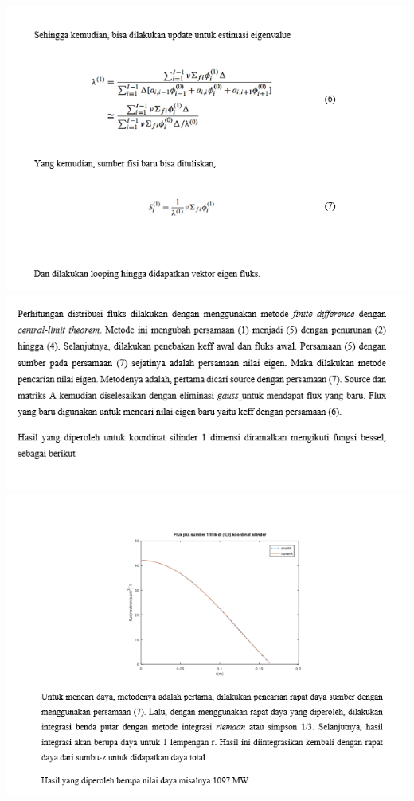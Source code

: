 \documentclass[12pt]{article}
\begin{document}
\begin{enumerate}
		\includegraphics[scale=1]{UASFiskom0504.png}\\
		\includegraphics[scale=1]{UASFiskom0505.png}\\
		\includegraphics[scale=1]{UASFiskom0506.png}\\

\end{enumerate}
\end{document}
